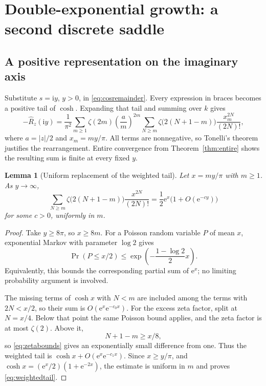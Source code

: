 \documentclass[11pt,a4paper]{article}
\numberwithin{equation}{section}
\newtheorem{lemma}[theorem]{Lemma}
\theoremstyle{definition}
\theoremstyle{remark}
\newcommand{\ii}{\mathrm i}
\newcommand{\e}{\mathrm e}
\begin{document}
\section{Double-exponential growth: a second discrete saddle}
\label{sec:imaginary}

\subsection{A positive representation on the imaginary axis}
Substitute $s=\ii y$, $y>0$, in \eqref{eq:cosremainder}. Every expression in braces becomes a positive tail of $\cosh$. Expanding that tail and summing over $k$ gives
\begin{equation}
 -\widehat R_z(\ii y)=\frac1{\pi^2}\sum_{m\ge1}\zeta(2m)
       \left(\frac{a}{m}\right)^{2m}
       \sum_{N\ge m}\zeta\bigl(2(N+1-m)\bigr)
              \frac{x_m^{2N}}{(2N)!},
 \label{eq:positiveB}
\end{equation}
where $a=|z|/2$ and $x_m=my/\pi$. All terms are nonnegative, so Tonelli's theorem justifies the rearrangement. Entire convergence from Theorem~\ref{thm:entire} shows the resulting sum is finite at every fixed $y$.

\begin{lemma}[Uniform replacement of the weighted tail]
\label{lem:poisson}
Let $x=my/\pi$ with $m\ge1$. As $y\to\infty$,
\begin{equation}
 \sum_{N\ge m}\zeta\bigl(2(N+1-m)\bigr)\frac{x^{2N}}{(2N)!}
 =\frac12\e^x\bigl(1+O(\e^{-cy})\bigr)
 \label{eq:weightedtail}
\end{equation}
for some $c>0$, uniformly in $m$.
\end{lemma}
\begin{proof}
Take $y\ge8\pi$, so $x\ge8m$. For a Poisson random variable $P$ of mean $x$, exponential Markov with parameter $\log2$ gives
\begin{equation}
 \Pr(P\le x/2)\le\exp\!\left(-\frac{1-\log2}{2}x\right).
 \label{eq:poissonbound}
\end{equation}
Equivalently, this bounds the corresponding partial sum of $\e^x$; no limiting probability argument is involved.

The missing terms of $\cosh x$ with $N<m$ are included among the terms with $2N<x/2$, so their sum is $O(\e^x\e^{-c_0x})$. For the excess zeta factor, split at $N=x/4$. Below that point the same Poisson bound applies, and the zeta factor is at most $\zeta(2)$. Above it,
\[
 N+1-m\ge x/8,
\]
so \eqref{eq:zetabounds} gives an exponentially small difference from one. Thus the weighted tail is $\cosh x+O(\e^x\e^{-c_1x})$. Since $x\ge y/\pi$, and $\cosh x=(\e^x/2)(1+\e^{-2x})$, the estimate is uniform in $m$ and proves \eqref{eq:weightedtail}.
\end{proof}
\end{document}
